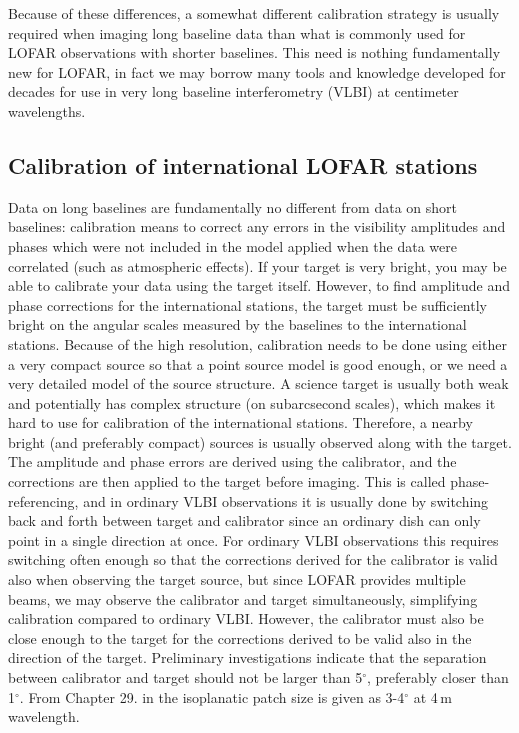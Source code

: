 Because of these differences, a somewhat different calibration strategy is
usually required when imaging long baseline data than what is commonly used for
LOFAR observations with shorter baselines. This need is nothing fundamentally
new for LOFAR, in fact we may borrow many tools and knowledge developed for
decades for use in very long baseline interferometry (VLBI) at centimeter
wavelengths.

\subsection{Calibration of international LOFAR stations}
Data on long baselines are fundamentally no different from data on short
baselines: calibration means to correct any errors in the visibility amplitudes
and phases which were not included in the model applied when the data were
correlated (such as atmospheric effects).  If your target is very bright, you
may be able to calibrate your data using the target itself.  However, to find
amplitude and phase corrections for the international stations, the target must
be sufficiently bright on the angular scales measured by the baselines to the
international stations.  Because of the high resolution, calibration needs to
be done using either a very compact source so that a point source model is good
enough, or we need a very detailed model of the source structure. A science
target is usually both weak and potentially has complex structure (on
subarcsecond scales), which makes it hard to use for calibration of the
international stations. Therefore, a nearby bright (and preferably compact)
sources is usually observed along with the target. The amplitude and phase
errors are derived using the calibrator, and the corrections are then applied
to the target before imaging. This is called phase-referencing, and in ordinary
VLBI observations it is usually done by switching back and forth between target
and calibrator since an ordinary dish can only point in a single direction at
once. For ordinary VLBI observations this requires switching often enough so
that the corrections derived for the calibrator is valid also when observing
the target source, but since LOFAR provides multiple beams, we may observe the
calibrator and target simultaneously, simplifying calibration compared to
ordinary VLBI. However, the calibrator must also be close enough to the target 
for the corrections derived to be valid also in the direction of the target.
Preliminary investigations indicate that the separation between calibrator
and target should not be larger than 5$^\circ$, preferably closer than 1$^\circ$.
From Chapter 29. in \cite{NRAO} the isoplanatic patch size is given as 3-4$^\circ$
at 4\,m wavelength.

